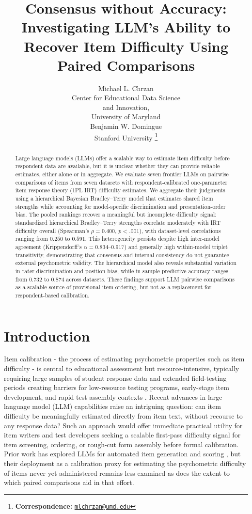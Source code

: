 \documentclass[11pt]{article}
\title{Consensus without Accuracy: Investigating LLM's Ability to Recover Item Difficulty Using Paired Comparisons}
\author{Michael L. Chrzan \\
  Center for Educational Data Science \\
  and Innovation, \\
  University of Maryland \\\And
  Benjamin W. Domingue \\
  Stanford University
  \thanks{\textbf{Correspondence:} \href{mailto:mlchrzan@umd.edu}{\texttt{mlchrzan@umd.edu}}}
}
\begin{document}
\maketitle

\begin{abstract}
Large language models (LLMs) offer a scalable way to estimate item difficulty before respondent data are available, but it is unclear whether they can provide reliable estimates, either alone or in aggregate. We evaluate seven frontier LLMs on pairwise comparisons of items from seven datasets with respondent-calibrated one-parameter item response theory (1PL IRT) difficulty estimates. We aggregate their judgments using a hierarchical Bayesian Bradley--Terry model that estimates shared item strengths while accounting for model-specific discrimination and presentation-order bias. The pooled rankings recover a meaningful but incomplete difficulty signal: standardized hierarchical Bradley--Terry strengths correlate moderately with IRT difficulty overall (Spearman's $\rho=0.400$, $p<.001$), with dataset-level correlations ranging from $0.250$ to $0.591$. This heterogeneity persists despite high inter-model agreement (Krippendorff's $\alpha=0.834$--$0.917$) and generally high within-model triplet transitivity, demonstrating that consensus and internal consistency do not guarantee external psychometric validity. The hierarchical model also reveals substantial variation in rater discrimination and position bias, while in-sample predictive accuracy ranges from $0.732$ to $0.874$ across datasets. These findings support LLM pairwise comparisons as a scalable source of provisional item ordering, but not as a replacement for respondent-based calibration.
\end{abstract}

\section{Introduction}
\label{sec:intro}

Item calibration - the process of estimating psychometric properties such as item difficulty - is central to educational assessment but resource-intensive, typically requiring large samples of student response data and extended field-testing periods creating barriers for low-resource testing programs, early-stage item development, and rapid test assembly contexts \citep{jiangSampleSizeRequirements2016}. Recent advances in large language model (LLM) capabilities raise an intriguing question: can item difficulty be meaningfully estimated directly from item text, without recourse to any response data? Such an approach would offer immediate practical utility for item writers and test developers seeking a scalable first-pass difficulty signal for item screening, ordering, or rough-cut form assembly before formal calibration. Prior work has explored LLMs for automated item generation and scoring \citep{vondavierComputationalPsychometricsNew2022}, but their deployment as a calibration proxy for estimating the psychometric difficulty of items never yet administered remains less examined as does the extent to which paired comparisons aid in that effort.
 
\end{document}
